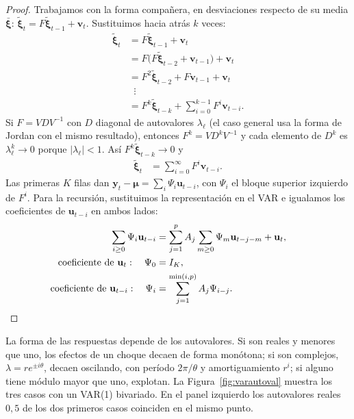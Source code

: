 \begin{proof}
Trabajamos con la forma compañera, en desviaciones respecto de su media $\bar{\boldsymbol\xi}$:
$\tilde{\boldsymbol\xi}_t=F\tilde{\boldsymbol\xi}_{t-1}+\mathbf v_t$. Sustituimos hacia atrás $k$ veces:
\begin{align*}
  \tilde{\boldsymbol\xi}_t &= F\tilde{\boldsymbol\xi}_{t-1}+\mathbf v_t\\
                           &= F\bigl(F\tilde{\boldsymbol\xi}_{t-2}+\mathbf v_{t-1}\bigr)+\mathbf v_t\\
                           &= F^2\tilde{\boldsymbol\xi}_{t-2}+F\mathbf v_{t-1}+\mathbf v_t\\
                           &\;\;\vdots\\
                           &= F^k\tilde{\boldsymbol\xi}_{t-k}+\sum_{i=0}^{k-1}F^i\mathbf v_{t-i}.
\end{align*}
Si $F=VDV^{-1}$ con $D$ diagonal de autovalores $\lambda_\ell$ (el caso general usa la forma de Jordan con el
mismo resultado), entonces $F^k=VD^kV^{-1}$ y cada elemento de $D^k$ es $\lambda_\ell^k\to0$ porque
$|\lambda_\ell|<1$. Así $F^k\tilde{\boldsymbol\xi}_{t-k}\to0$ y
\begin{align*}
  \tilde{\boldsymbol\xi}_t &= \sum_{i=0}^{\infty}F^i\mathbf v_{t-i}.
\end{align*}
Las primeras $K$ filas dan $\mathbf y_t-\boldsymbol\mu=\sum_i\Psi_i\mathbf u_{t-i}$, con $\Psi_i$ el bloque
superior izquierdo de $F^i$. Para la recursión, sustituimos la representación en el VAR e igualamos los
coeficientes de $\mathbf u_{t-i}$ en ambos lados:
\begin{align*}
  \sum_{i\ge0}\Psi_i\mathbf u_{t-i}
     &= \sum_{j=1}^{p}A_j\sum_{m\ge0}\Psi_m\mathbf u_{t-j-m}+\mathbf u_t,\\
  \text{coeficiente de }\mathbf u_t:\quad \Psi_0 &= I_K,\\
  \text{coeficiente de }\mathbf u_{t-i}:\quad \Psi_i &= \sum_{j=1}^{\min(i,p)}A_j\Psi_{i-j}. && \qedhere
\end{align*}
\end{proof}

La forma de las respuestas depende de los autovalores. Si son reales y menores que uno, los efectos de un
choque decaen de forma monótona; si son complejos, $\lambda=re^{\pm i\theta}$, decaen oscilando, con período
$2\pi/\theta$ y amortiguamiento $r^i$; si alguno tiene módulo mayor que uno, explotan. La
Figura~\ref{fig:varautoval} muestra los tres casos con un VAR(1) bivariado. En el panel izquierdo los
autovalores reales $0{,}5$ de los dos primeros casos coinciden en el mismo punto.

